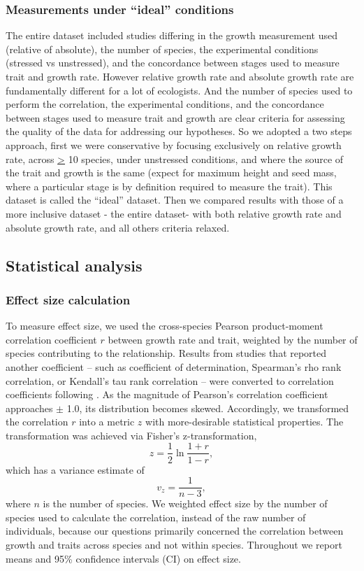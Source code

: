 \documentclass[a4paper,11pt]{article}
\begin{document}
\subsubsection*{Measurements under ``ideal'' conditions}\label{ideal-vs-entire-dataset}

The entire dataset included studies differing in the growth measurement used (relative of absolute), the number of species, the experimental conditions (stressed vs unstressed), and the concordance between stages used to measure trait and growth rate. However relative growth rate and absolute growth rate are fundamentally different for a lot of ecologists. And the number of species used to perform the correlation, the experimental conditions, and the concordance between stages used to measure trait and growth are clear criteria for assessing the quality of the data for addressing our hypotheses. So we adopted a two steps approach, first we were conservative by focusing exclusively on relative growth rate, across \underline{\textgreater} 10 species, under unstressed conditions, and where the source of the trait and growth is the same (expect for maximum height and seed mass, where a particular stage is by definition required to measure the trait). This dataset is called the ``ideal'' dataset. Then we compared results with those of a more inclusive dataset - the entire dataset- with both relative growth rate and absolute growth rate, and all others criteria relaxed.

\subsection*{Statistical analysis}\label{statistical-analyses}

\subsubsection*{Effect size calculation}\label{effect-size}

To measure effect size, we used the cross-species Pearson product-moment correlation coefficient $r$ between growth rate and trait, weighted by the number of species contributing to the relationship. Results from studies that reported another coefficient -- such as coefficient of determination, Spearman's rho rank correlation, or Kendall's tau rank correlation -- were converted to correlation coefficients following \citet{Lajeunesse:2013tm}. As the magnitude of Pearson's correlation coefficient approaches $\pm$ 1.0, its distribution becomes skewed. Accordingly, we transformed the correlation $r$ into a metric $z$ with more-desirable statistical properties. The transformation was achieved via Fisher's z-transformation,
\[ z = \frac{1}{2} \ln \frac{1+r}{1-r},\]
which has a variance estimate of
\[ v_z= \frac{1}{n-3},\]
where $n$ is the number of species. We weighted effect size by the number of species used to calculate the correlation, instead of the raw number of individuals, because our questions primarily concerned the correlation between growth and traits across species and not within species. Throughout we report means and 95\% confidence intervals (CI) on effect size.
\end{document}

